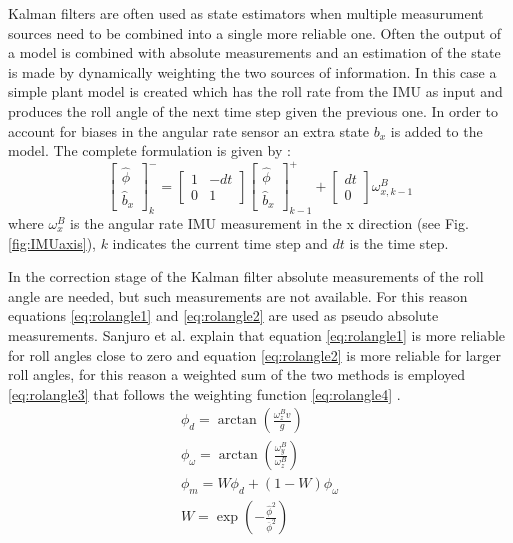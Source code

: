 Kalman filters are often used as state estimators when multiple measurument sources need to be combined into a single more reliable one. Often the output of a model is combined with absolute measurements and an estimation of the state is made by dynamically weighting the two sources of information. In this case a simple plant model is created which has the roll rate from the IMU as input and  produces the roll angle of the next time step given the previous one. In order to account for biases in the angular rate sensor an extra state \ensuremath{b_x} is added to the model. The complete formulation is given by :
\begin{equation}
\left[ \begin{array}{c}{\hat{\phi}} \\ {\hat{b}_{x}}\end{array}\right]_{k}^{-}=\left[ \begin{array}{cc}{1} & {-d t} \\ {0} & {1}\end{array}\right] \left[ \begin{array}{c}{\hat{\phi}} \\ {\hat{b}_{x}}\end{array}\right]_{k-1}^{+}+\left[ \begin{array}{c}{d t} \\ {0}\end{array}\right] \omega_{x, k-1}^{B}
\end{equation}
where \ensuremath{\omega_{x}^{B}} is the angular rate IMU measurement in the x direction (see Fig.\ref{fig:IMUaxis}), \ensuremath{k} indicates the current time step and \ensuremath{dt} is the time step. 


In the correction stage of the Kalman filter absolute measurements of the roll angle are needed, but such measurements are not available. For this reason equations \ref{eq:rolangle1} and \ref{eq:rolangle2} are used as pseudo absolute measurements. Sanjuro et al. explain that equation \ref{eq:rolangle1} is more reliable for roll angles close to zero and equation \ref{eq:rolangle2} is more reliable for larger roll angles, for this reason  a weighted sum of the two methods is employed \ref{eq:rolangle3} that follows the weighting function \ref{eq:rolangle4} .
\begin{align}
      \phi_{d}=\arctan \left(\frac{\omega_{z}^{B} v}{g}\right) \label{eq:rolangle1}
    \\
      \phi_{\omega}=\arctan \left(\frac{\omega_{y}^{B}}{\omega_{z}^{B}}\right)\label{eq:rolangle2}
      \\
      \phi_{m}=W \phi_{d}+(1-W) \phi_{\omega} \label{eq:rolangle3} 
      \\
      W=\exp \left(-\frac{\hat{\phi}^{2}}{\overline{\phi}^{2}}\right)
  \label{eq:rolangle4}
\end{align}


